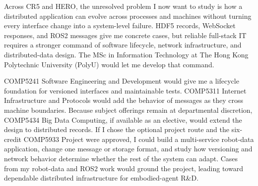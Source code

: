 Across CR5 and HERO, the unresolved problem I now want to study is how a distributed application can evolve across processes and machines without turning every interface change into a system-level failure. HDF5 records, WebSocket responses, and ROS2 messages give me concrete cases, but reliable full-stack IT requires a stronger command of software lifecycle, network infrastructure, and distributed-data design. The MSc in Information Technology at The Hong Kong Polytechnic University (PolyU) would let me develop that command.

COMP5241 Software Engineering and Development would give me a lifecycle foundation for versioned interfaces and maintainable tests. COMP5311 Internet Infrastructure and Protocols would add the behavior of messages as they cross machine boundaries. Because subject offerings remain at departmental discretion, COMP5434 Big Data Computing, if available as an elective, would extend the design to distributed records. If I chose the optional project route and the six-credit COMP5933 Project were approved, I could build a multi-service robot-data application, change one message or storage format, and study how versioning and network behavior determine whether the rest of the system can adapt. Cases from my robot-data and ROS2 work would ground the project, leading toward dependable distributed infrastructure for embodied-agent R\&D.
